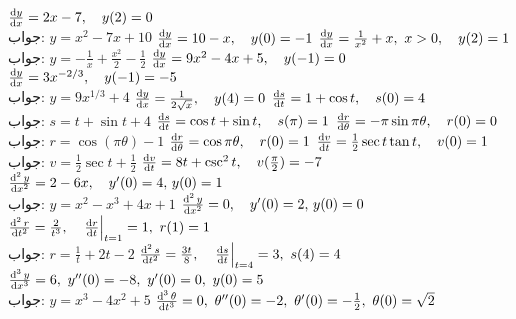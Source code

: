 $\tfrac{\dif y}{\dif x}=2x-7,\quad y(2)=0$\\
جواب:\quad
$y=x^2-7x+10$
$\tfrac{\dif y}{\dif x}=10-x,\quad y(0)=-1$
$\tfrac{\dif y}{\dif x}=\tfrac{1}{x^2}+x,\,\, x>0,\quad y(2)=1$\\
جواب:\quad
$y=-\tfrac{1}{x}+\tfrac{x^2}{2}-\tfrac{1}{2}$
$\tfrac{\dif y}{\dif x}=9x^2-4x+5,\quad y(-1)=0$
$\tfrac{\dif y}{\dif x}=3x^{-2/3},\quad y(-1)=-5$\\
جواب:\quad
$y=9x^{1/3}+4$
$\tfrac{\dif y}{\dif x}=\tfrac{1}{2\sqrt{x}},\quad y(4)=0$
$\tfrac{\dif s}{\dif t}=1+\cos t,\quad s(0)=4$\\
جواب:\quad
$s=t+\sin t+4$
$\tfrac{\dif s}{\dif t}=\cos t+\sin t,\quad s(\pi)=1$
$\tfrac{\dif r}{\dif \theta}=-\pi\sin \pi \theta,\quad r(0)=0$\\
جواب:\quad
$r=\cos (\pi \theta)-1$
$\tfrac{\dif  r}{\dif \theta}=\cos \pi\theta,\quad r(0)=1$
$\tfrac{\dif v}{\dif t}=\tfrac{1}{2}\sec t\tan t,\quad v(0)=1$\\
جواب:\quad
$v=\tfrac{1}{2}\sec t+\tfrac{1}{2}$
$\tfrac{\dif v}{\dif t}=8t+\csc^2 t,\quad v(\tfrac{\pi}{2})=-7$
$\tfrac{\dif^{\,2}y}{\dif x^2}=2-6x,\quad y'(0)=4,\, y(0)=1$\\
جواب:\quad
$y=x^2-x^3+4x+1$
$\tfrac{\dif^{\,2}y}{\dif x^2}=0,\quad y'(0)=2,\, y(0)=0$
$\tfrac{\dif^{\,2}r}{\dif  t^2}=\tfrac{2}{t^3},\quad \left.\tfrac{\dif r}{\dif t}\right|_{t=1}=1,\,\, r(1)=1$\\
جواب:\quad
$r=\tfrac{1}{t}+2t-2$
$\tfrac{\dif^{\,2}s}{\dif  t^2}=\tfrac{3t}{8},\quad \left.\tfrac{\dif s}{\dif t}\right|_{t=4}=3,\,\, s(4)=4$
$\tfrac{\dif^{\,3}y}{\dif  x^3}=6,\,\, y''(0)=-8,\,\, y'(0)=0,\,\, y(0)=5$\\
جواب:\quad
$y=x^3-4x^2+5$
$\tfrac{\dif^{\,3}\theta}{\dif  t^3}=0,\,\, \theta''(0)=-2,\,\, \theta'(0)=-\tfrac{1}{2},\,\, \theta(0)=\sqrt{2}$
